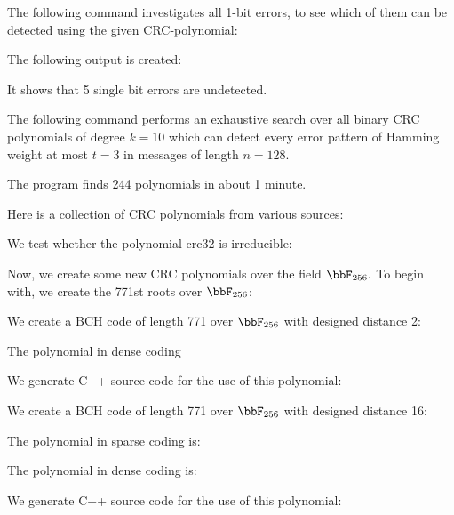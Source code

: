 \bigskip


The following command investigates all 1-bit errors, to see which of them can be detected
using the given CRC-polynomial: 
{\tt

}
The following output is created:
\begin{mdframed}[style=MyFrame]
{\small

}
\end{mdframed}
It shows that 5 single bit errors are undetected.

\bigskip

The following command performs an exhaustive search over all binary CRC polynomials of degree $k=10$ 
which can detect every error pattern of Hamming weight at most $t=3$ in messages of length $n=128.$ 
{\tt

}
The program finds 244 polynomials in about 1 minute.



\bigskip

Here is a collection of CRC polynomials from various sources:
{\tt

}
{\tt

}
{\tt

}
{\tt

}
{\tt

}
{\tt

}
{\tt

}
{\tt

}


\bigskip


%
%

We test whether the polynomial crc32 is irreducible:
{\tt

}

\bigskip

Now, we create some new CRC polynomials over the field $\bbF_{256}.$
To begin with, we create the 771st roots over $\bbF_{256}$:
{\tt

}
We create a BCH code of length 771 over $\bbF_{256}$ with designed distance 2:
{\tt

}
The polynomial in dense coding
{\tt

}
We generate C++ source code for the use of this polynomial:
{\tt

}
We create a BCH code of length 771 over $\bbF_{256}$ with designed distance 16:
{\tt

}
The polynomial in sparse coding is:
{\tt

}
The polynomial in dense coding is:
{\tt

}
We generate C++ source code for the use of this polynomial:
{\tt

}



